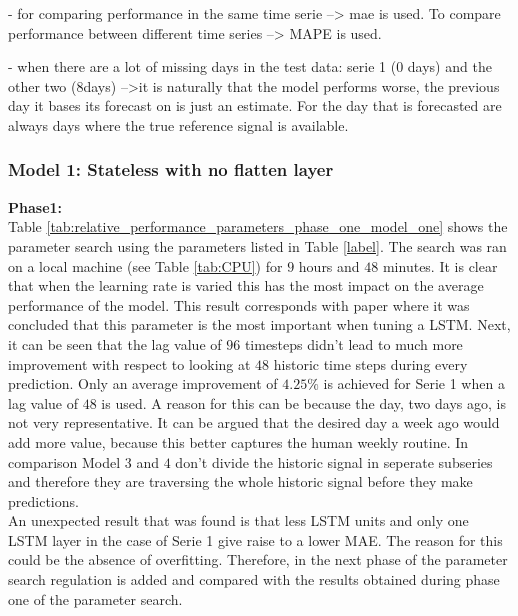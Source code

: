 - for comparing performance in the same time serie --> mae is used. To compare performance between different time series --> MAPE is used. 

- when there are a lot of missing days in the test data: serie 1 (0 days) and the other two (8days) -->it is naturally that the model performs worse, the previous day it bases its forecast on is just an estimate. For the day that is forecasted are always days where the true reference signal is available. 


\subsubsection{Model 1: Stateless with no flatten layer}



\textbf{Phase1:}\\
Table \ref{tab:relative_performance_parameters_phase_one_model_one} shows the parameter search using the parameters listed in Table \ref{label}. The search was ran on a local machine (see Table \ref{tab:CPU}) for $ 9 $ hours and $ 48 $ minutes. It is clear that when the learning rate is varied this has the most impact on the average performance of the model. This result corresponds with paper \cite{Greff2017} where it was concluded that this parameter is the most important when tuning a LSTM. Next, it can be seen that the lag value of $ 96 $ timesteps didn't lead to much more improvement with respect to looking at $ 48 $ historic time steps during every prediction. Only an average improvement of $ 4.25 \% $ is achieved for Serie 1 when a lag value of $ 48 $ is used. A reason for this can be because the day, two days ago, is not very representative. It can be argued that the desired day a week ago would add more value, because this better captures the human weekly routine. In comparison Model $ 3 $ and $ 4 $ don't divide the historic signal in seperate subseries and therefore they are traversing the whole historic signal before they make predictions.\\
An unexpected result that was found is that less LSTM units and only one LSTM layer in the case of Serie 1 give raise to a lower MAE. The reason for this could be the absence of overfitting. Therefore, in the next phase of the parameter search regulation is added and compared with the results obtained during phase one of the parameter search. 

